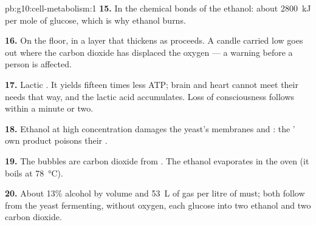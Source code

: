 \begin{solution}{pb:g10:cell-metabolism:1}
\textbf{15.} In the chemical bonds of the ethanol: about
\qty{2800}{kJ} per mole of glucose, which is why ethanol burns.

\textbf{16.} On the floor, in a layer that thickens as 
proceeds. A candle carried low goes out where the carbon dioxide has
displaced the oxygen --- a warning before a person is affected.

\textbf{17.} Lactic . It yields fifteen times less ATP;
brain and heart cannot meet their needs that way, and the lactic acid
accumulates. Loss of consciousness follows within a minute or two.

\textbf{18.} Ethanol at high concentration damages the yeast's
membranes and : the ' own product poisons their
.

\textbf{19.} The bubbles are carbon dioxide from . The
ethanol evaporates in the oven (it boils at \qty{78}{\celsius}).

\textbf{20.} About 13\% alcohol by volume and \qty{53}{L} of gas per
litre of must; both follow from the yeast fermenting, without oxygen,
each glucose into two ethanol and two carbon dioxide.
\end{solution}
